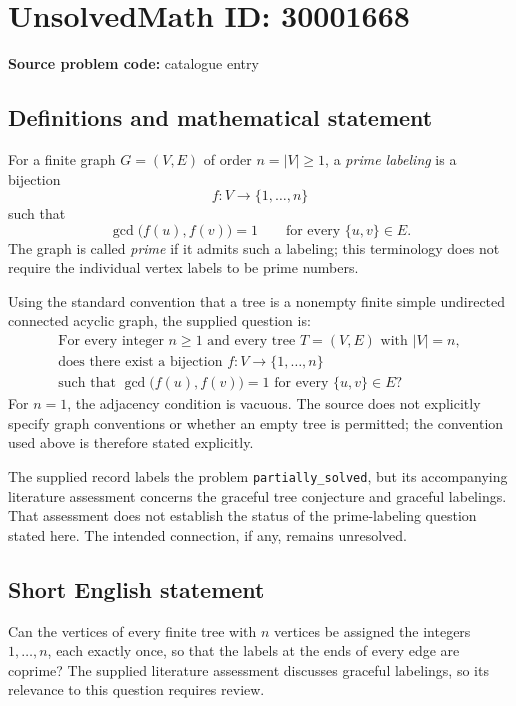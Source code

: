 \documentclass[11pt]{article}
\begin{document}
\section*{UnsolvedMath ID: 30001668}
\textbf{Source problem code:} catalogue entry
\subsection{Definitions and mathematical statement}
For a finite graph \(G=(V,E)\) of order \(n=|V|\geq 1\), a \emph{prime labeling} is a bijection
\[
f:V\longrightarrow\{1,\ldots,n\}
\]
such that
\[
\gcd\bigl(f(u),f(v)\bigr)=1
\qquad\text{for every }\{u,v\}\in E.
\]
The graph is called \emph{prime} if it admits such a labeling; this terminology does not require the individual vertex labels to be prime numbers.

Using the standard convention that a tree is a nonempty finite simple undirected connected acyclic graph, the supplied question is:
\[
\begin{gathered}
\text{For every integer }n\geq 1\text{ and every tree }T=(V,E)\text{ with }|V|=n,\\
\text{does there exist a bijection }f:V\longrightarrow\{1,\ldots,n\}\\
\text{such that }\gcd\bigl(f(u),f(v)\bigr)=1
\text{ for every }\{u,v\}\in E?
\end{gathered}
\]
For \(n=1\), the adjacency condition is vacuous. The source does not explicitly specify graph conventions or whether an empty tree is permitted; the convention used above is therefore stated explicitly.

The supplied record labels the problem \texttt{partially\_solved}, but its accompanying literature assessment concerns the graceful tree conjecture and graceful labelings. That assessment does not establish the status of the prime-labeling question stated here. The intended connection, if any, remains unresolved.
\subsection{Short English statement}
Can the vertices of every finite tree with \(n\) vertices be assigned the integers \(1,\ldots,n\), each exactly once, so that the labels at the ends of every edge are coprime? The supplied literature assessment discusses graceful labelings, so its relevance to this question requires review.
\end{document}
